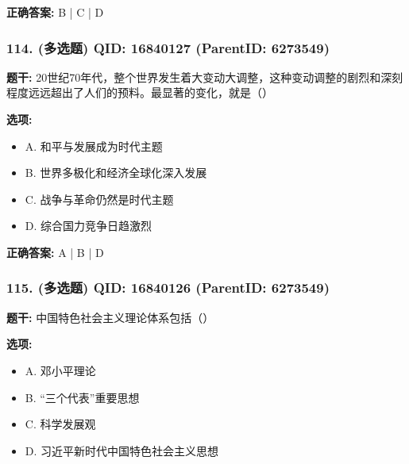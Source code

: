 \documentclass[12pt,UTF8]{ctexart}
\begin{document}
\textbf{正确答案:}
B | C | D

\vspace{0.3em}\hrulefill\vspace{0.7em}

\subsubsection*{114. (多选题) \small QID: 16840127 (ParentID: 6273549)}

\textbf{题干:}
20世纪70年代，整个世界发生着大变动大调整，这种变动调整的剧烈和深刻程度远远超出了人们的预料。最显著的变化，就是（）



\textbf{选项:}
\begin{itemize}[leftmargin=*]

  \item A. 和平与发展成为时代主题

  \item B. 世界多极化和经济全球化深入发展

  \item C. 战争与革命仍然是时代主题

  \item D. 综合国力竞争日趋激烈

\end{itemize}

\textbf{正确答案:}
A | B | D

\vspace{0.3em}\hrulefill\vspace{0.7em}

\subsubsection*{115. (多选题) \small QID: 16840126 (ParentID: 6273549)}

\textbf{题干:}
中国特色社会主义理论体系包括（）



\textbf{选项:}
\begin{itemize}[leftmargin=*]

  \item A. 邓小平理论

  \item B. “三个代表”重要思想

  \item C. 科学发展观

  \item D. 习近平新时代中国特色社会主义思想

\end{itemize}
\end{document}
